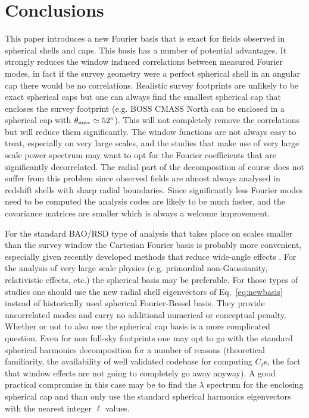 \documentclass[fleqn,usenatbib]{mnras}
\begin{document}
\section{Conclusions}
\label{sec:conclusions}

This paper introduces a new Fourier basis that is exact for fields observed in
spherical shells and caps. This basis has a number of potential advantages.  It
strongly reduces the window induced correlations between measured Fourier
modes, in fact if the survey geometry were a perfect spherical shell in an
angular cap there would be no correlations. Realistic survey footprints are
unlikely to be exact spherical caps but one can always find the smallest
spherical cap that encloses the survey footprint (e.g. BOSS CMASS North can be
enclosed in a spherical cap with $\theta_\mathrm{max} \simeq 52\degree$). This
will not completely remove the correlations but will reduce them significantly.
The window functions are not always easy to treat, especially on very large
scales, and the studies that make use of very large scale power spectrum may
want to opt for the Fourier coefficients that are significantly decorrelated.
The radial part of the decomposition of course does not suffer from this
problem since observed fields are almost always analysed in redshift shells
with sharp radial boundaries. Since significantly less Fourier modes need
to be computed the analysis codes are likely to be much faster, and the
covariance matrices are smaller which is always a welcome improvement.

For the standard BAO/RSD type of analysis that takes place on scales smaller
than the survey window the Cartesian Fourier basis is probably more convenient,
especially given recently developed methods that reduce wide-angle effects
\citep{2015MNRAS.453L..11B,2015PhRvD..92h3532S}. For the analysis of very large
scale physics (e.g. primordial non-Gaussianity, relativistic effects, etc.) the
spherical basis may be preferable. For those types of studies one should use
the new radial shell eigenvectors of Eq.~\eqref{eq:newbasis} instead of
historically used spherical Fourier-Bessel basis.  They provide uncorrelated
modes and carry no additional numerical or conceptual penalty. Whether or not
to also use the spherical cap basis is a more complicated question. Even for non
full-sky footprints one may opt to go with the standard spherical harmonics
decomposition for a number of reasons (theoretical familiarity, the
availability of well validated codebase for computing $C_\ell$s, the fact that window
effects are not going to completely go away anyway). A good practical
compromise in this case may be to find the $\lambda$ spectrum for the enclosing
spherical cap and than only use the standard spherical harmonics eigenvectors
with the nearest integer $\ell$ values.
\end{document}
